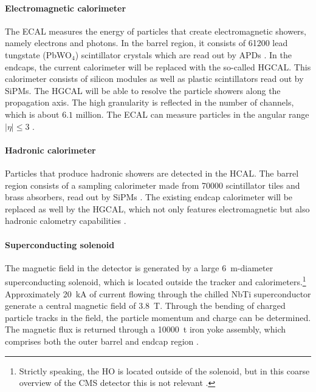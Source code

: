 \paragraph{Electromagnetic calorimeter}
The \ac{ECAL} measures the energy of particles that create electromagnetic showers, namely electrons and photons. In the barrel region, it consists of \num{61200} lead tungstate (PbWO$_4$) scintillator crystals which are read out by \acp{APD} \cite{CMS-Main}. In the endcaps, the current calorimeter will be replaced with the so-called \ac{HGCAL}. This calorimeter consists of silicon modules as well as plastic scintillators read out by \acp{SiPM}. The \ac{HGCAL} will be able to resolve the particle showers along the propagation axis. The high granularity is reflected in the number of channels, which is about $6.1$ million. The \ac{ECAL} can measure particles in the angular range $\left| \eta \right|\leq 3$ \cite{CMS-Phase2BarrelCalo,CMS-Phase2EndcapCalo,CMS-Phase2}.
\paragraph{Hadronic calorimeter}
Particles that produce hadronic showers are detected in the \ac{HCAL}. The barrel region consists of a sampling calorimeter made from \num{70000} scintillator tiles and brass absorbers, read out by \acp{SiPM} \cite{CMS-Main}. The existing endcap calorimeter will be replaced as well by the \ac{HGCAL}, which not only features electromagnetic but also hadronic calometry capabilities \cite{CMS-Phase2BarrelCalo,CMS-Phase2EndcapCalo}.
\paragraph{Superconducting solenoid}
The magnetic field in the detector is generated by a large \SI{6}{\meter}-diameter superconducting solenoid, which is located outside the tracker and calorimeters.\footnote{Strictly speaking, the \ac{HO} is located outside of the solenoid, but in this coarse overview of the \ac{CMS} detector this is not relevant \cite{CMS-Main}.} Approximately \SI{20}{\kilo\ampere} of current flowing through the chilled NbTi superconductor generate a central magnetic field of \SI{3.8}{\tesla}. Through the bending of charged particle tracks in the field, the particle momentum and charge can be determined. The magnetic flux is returned through a \SI{10000}{\tonne} iron yoke assembly, which comprises both the outer barrel and endcap region \cite{CMS-Main}.
